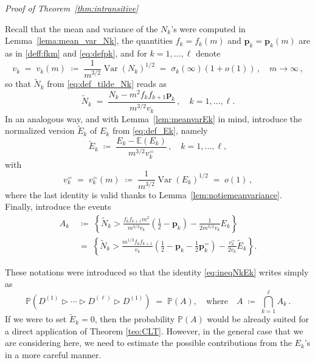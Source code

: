 \documentclass[reqno,a4paper,11pt]{amsart}
\makeatletter
\newcommand{\btt}{\triangleright}
\theoremstyle{remark}
\newcommand{\mb}[1]{{\mathbf #1}}
\newcommand{\bb}[1]{{\mathbb #1}}
\numberwithin{equation}{section}
\newcommand{\var}[1]{\operatorname{Var}\left(#1\right)}
\renewenvironment{proof}[1][Proof]{\par
\pushQED{\qed}%
\normalfont \topsep6\p@\@plus6\p@\relax
\trivlist
\item\relax
{\itshape
#1\@addpunct{.}}\hspace\labelsep\ignorespaces
}{%
\popQED\endtrivlist\@endpefalse
}
\makeatother
\begin{document}
\begin{proof}[Proof of Theorem~\ref{thm:intransitive}]
Recall that the mean and variance of the $N_k$'s were computed in Lemma~\ref{lema:mean_var_Nk}, the quantities $f_k=f_k(m)$ and $\mb p_k=\mb p_k(m)$ are as in \eqref{deff:fkm} and \eqref{eq:defpk}, and for $k=1,\hdots, \ell$ denote
%
$$
v_k\;=\;v_k(m)\;\coloneqq\; \frac{1}{m^{3/2}}\var{N_k}^{1/2}\;=\;\sigma_k(\infty)(1+o(1))\,, \quad m\to\infty\,,
$$
%
so that $\widetilde N_k$ from \eqref{eq:def_tilde_Nk} reads as
%
$$
\widetilde N_k\;=\;\frac{N_k-m^2f_kf_{k+1}\mb p_k}{m^{3/2}v_k}\,,\quad k=1,\hdots,\ell.
$$
%
In an analogous way, and with Lemma~\ref{lem:meanvarEk} in mind, introduce the normalized version $\widetilde E_k$ of $E_k$ from \eqref{eq:def_Ek}, namely
%
$$
\widetilde E_k\;\coloneqq\; \frac{E_k-\bb E(E_k)}{m^{3/2}v_k^=}\,,\quad k=1,\hdots, \ell,
$$
%
with
%
\begin{equation}\label{eq:varEkdecayfinal}
v_k^=\;=\;v_k^=(m)\;\coloneqq\; \frac{1}{m^{3/2}}\var{E_k}^{1/2}\;=\;o(1)\,,
\end{equation}
%
where the last identity is valid thanks to Lemma~\ref{lem:notiemeanvariance}.
%
Finally, introduce the events
%
\begin{align*}
A_k & \;\coloneqq\; \left\{ \widetilde N_k>\frac{f_kf_{k+1}m^2}{m^{3/2}v_k}\left(\frac{1}{2}-\mb p_k\right)-\frac{1}{2m^{3/2}v_k}E_k \right\} \\
& \;=\; \left\{ \widetilde N_k>\frac{m^{1/2}f_kf_{k+1}}{v_k}\left(\frac{1}{2}-\mb p_k-\frac{1}{2}\mb p_k^=\right)-\frac{v_k^=}{2v_k}\widetilde E_k \right\}.
\end{align*}

These notations were introduced so that the identity \eqref{eq:ineqNkEk} writes simply as
%
$$
\bb P(D^{(1)}\btt \cdots \btt D^{(\ell)}\btt D^{(1)})\;=\;\bb P\left(A\right), \quad \text{where}\quad A\;\coloneqq\; \bigcap_{k=1}^\ell A_k\,.
$$
%
If we were to set $\widetilde E_k=0$, then the probability $\bb P(A)$ would be already suited for a direct application of Theorem \ref{teo:CLT}. However, in the general case that we are considering here, we need to estimate the possible contributions from the $E_k$'s in a more careful manner.


\end{proof}
\end{document}
